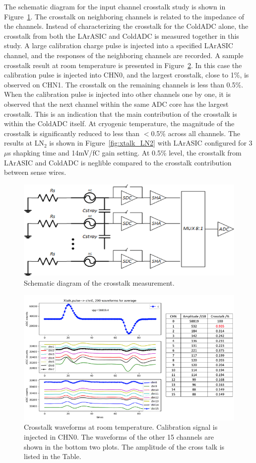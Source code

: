 \label{sec:4.4}
The schematic diagram for the input channel crosstalk study is shown in Figure~\ref{fig:xtalk_schematic}. The crosstalk on neighboring channels is
 related to the impedance of the channels. Instead of characterizing the crosstalk for the ColdADC alone, the 
crosstalk from both the LArASIC and ColdADC is measured together in this study. A large calibration charge 
pulse is injected into a specified LArASIC channel, and the responses of the neighboring channels are recorded. A sample crosstalk result at 
room temperature is presented in Figure~\ref{fig:xtalk_RT}. In this case the calibration pulse is injected into CHN0, and the largest crosstalk, close to 1\%, 
is observed on CHN1. The crosstalk on the remaining channels is less than 0.5\%.  When the calibration pulse 
is injected into other channels one by one, it is observed that the next channel within the same ADC core has the largest crosstalk. 
This is an indication that the main contribution of the crosstalk is within the ColdADC itself. At cryogenic temperature, the magnitude of the 
crosstalk is significantly reduced to less than $<$0.5\% across all channels. The results at LN$_2$ is shown in Figure~\ref{fig:xtalk_LN2} with LArASIC configured
for 3$\mu$s shapking time and 14mV/fC gain setting. At 0.5\% level, the crosstalk from LArASIC and ColdADC is neglible compared to the crosstalk 
contribution between sense wires.
\begin{figure}[h!]
\centering
  \includegraphics[width=0.7\linewidth]{figures/xtalk_schematic.png}
  \caption{Schematic diagram of the crosstalk measurement.}
  \label{fig:xtalk_schematic}
\end{figure}
\begin{figure}[h!]
\centering
  \includegraphics[width=0.7\linewidth]{figures/xtalk_RT.png}
  \caption{Crosstalk waveforms at room temperature. Calibration signal is injected in CHN0. The waveforms of the other 15 channels are shown in the bottom two plots. The amplitude of the cross talk is listed in the Table.}
  \label{fig:xtalk_RT}
\end{figure}
